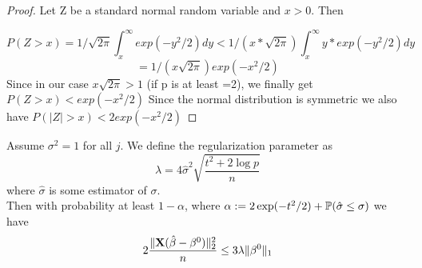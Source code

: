 \begin{proof}
    Let Z be a standard normal random variable and $x>0$. Then

    $$P(Z>x)= 1/\sqrt{2\pi} \int_x^{\infty} exp(-y^2/2) dy < 1/(x*\sqrt{2\pi}) \int_x^{\infty} y*exp(-y^2/2) dy $$
    $$= 1/(x\sqrt{2\pi}) exp(-x^2/2)$$
    Since in our case $x\sqrt{2\pi}>1$ (if p is at least =2), we finally get
    $P(Z>x)< exp(-x^2/2)$
    Since the normal distribution is symmetric we also have
    $P(|Z|>x)< 2exp(-x^2/2)$
\end{proof}

\begin{corollary}
    Assume $\sigma^2 = 1$ for all $j$. We define the regularization parameter as
    $$\lambda = 4 \hat \sigma^2 \sqrt{\frac{t^2 + 2 \log p}{n}}$$
    where $\hat \sigma$ is some estimator of $\sigma$. \\
    Then with probability at least $1 - \alpha$, where $\alpha := 2 \exp(-t^2/2) + \P (\hat \sigma \leq \sigma)$ we have
    $$2 \frac{\| \X (\hat \beta - \beta^0)\|_2^2}{n} \leq 3 \lambda \| \beta^0 \|_1$$
\end{corollary}

